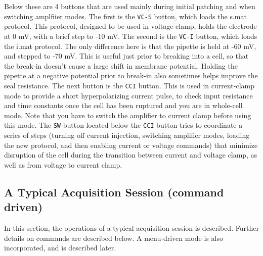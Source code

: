 \documentclass[11pt, letterpaper, titlepage]{paper}
\begin{document}
Below these are 4 buttons that are used mainly during initial patching and when switching amplfiier modes. The first is the \texttt{VC-S} button, which loads the s.mat protocol. This protocol, designed to be used in voltage-clamp, holds the electrode at 0 mV, with a brief step to -10 mV. The second is the \texttt{VC-I} button, which loads the i.mat protocol. The only difference here is that the pipette is held at -60 mV, and stepped to -70 mV. This is useful just prior to breaking into a cell, so that the break-in doesn't cause a large shift in membrane potential. Holding the pipette at a negative potential prior to break-in also sometimes helps improve the seal resistance. The next button is the \texttt{CCI} button. This is used in current-clamp mode to provide a short hyperpolarizing current pulse, to check input resistance and time constants once the cell has been ruptured and you are in whole-cell mode. Note that you have to switch the amplifier to current clamp before using this mode. The \texttt{SW} button located below the \texttt{CCI} button tries to coordinate a series of steps (turning off current injection, switching amplifier
modes, loading the new protocol, and then enabling current or voltage commands) that minimize disruption of the cell during the transition between current and voltage clamp, as well as from voltage to current clamp.


\subsection{A Typical Acquisition Session (command driven)}

In this section, the operations of a typical acquisition session 
is described. Further details on commands are described below. A 
menu-driven mode is also incorporated, and is described later.
\end{document}
